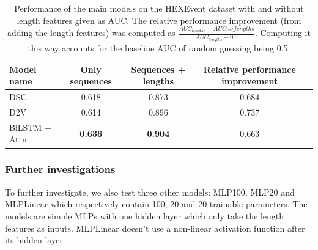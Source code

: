 \begin{table}[h!]
	\centering
	\begin{tabular}{| l | c | c | c| c} 
		\hline
		Model name & Only sequences & Sequences + lengths & Relative performance improvement\\
		\hline
		DSC & 0.618 & 0.873 & 0.684\\
		D2V & 0.614 & 0.896 & 0.737\\
		BiLSTM + Attn & \textbf{0.636} & \textbf{0.904} & 0.663\\
		\hline
	\end{tabular}
	\caption{Performance of the main models on the HEXEvent dataset with and without length features given as AUC. The relative performance improvement (from adding the length features) was computed as $\frac{AUC_{lengths} - AUC{no\_lengths}}{AUC_{lengths} - 0.5}$. Computing it this way accounts for the baseline AUC of random guessing being 0.5.
	}
	\label{table:results_hexevent}
\end{table}

\subsubsection{Further investigations}
To further investigate, we also test three other models: MLP100, MLP20 and MLPLinear which respectively contain 100, 20 and 20 trainable parameters. The models are simple MLPs with one hidden layer which only take the length features as inputs. MLPLinear doesn't use a non-linear activation function after its hidden layer.

